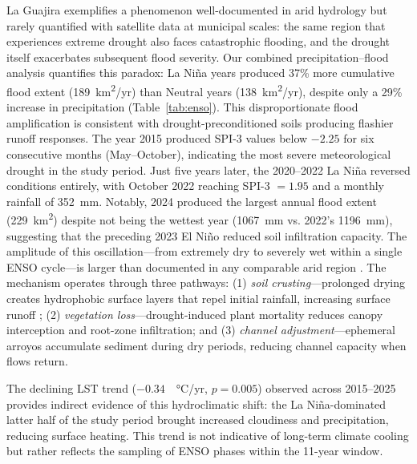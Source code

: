 \documentclass{article}
\begin{document}
La Guajira exemplifies a phenomenon well-documented in arid hydrology but rarely quantified with satellite data at municipal scales: the same region that experiences extreme drought also faces catastrophic flooding, and the drought itself exacerbates subsequent flood severity. Our combined precipitation--flood analysis quantifies this paradox: La Ni\~na years produced 37\% more cumulative flood extent (\SI{189}{\kilo\metre\squared/yr}) than Neutral years (\SI{138}{\kilo\metre\squared/yr}), despite only a 29\% increase in precipitation (Table~\ref{tab:enso}). This disproportionate flood amplification is consistent with drought-preconditioned soils producing flashier runoff responses. The year 2015 produced SPI-3 values below $-2.25$ for six consecutive months (May--October), indicating the most severe meteorological drought in the study period. Just five years later, the 2020--2022 La Ni\~na reversed conditions entirely, with October 2022 reaching SPI-3 $= 1.95$ and a monthly rainfall of \SI{352}{\milli\metre}. Notably, 2024 produced the largest annual flood extent (\SI{229}{\kilo\metre\squared}) despite not being the wettest year (\SI{1067}{mm} vs. 2022's \SI{1196}{mm}), suggesting that the preceding 2023 El Ni\~no reduced soil infiltration capacity. The amplitude of this oscillation---from extremely dry to severely wet within a single ENSO cycle---is larger than documented in any comparable arid region \citep{DroughtFloodMonitoring2024}. The mechanism operates through three pathways: (1) \textit{soil crusting}---prolonged drying creates hydrophobic surface layers that repel initial rainfall, increasing surface runoff \citep{Alabbad2023}; (2) \textit{vegetation loss}---drought-induced plant mortality reduces canopy interception and root-zone infiltration; and (3) \textit{channel adjustment}---ephemeral arroyos accumulate sediment during dry periods, reducing channel capacity when flows return.

The declining LST trend ($-0.34$~\SI{}{\celsius/yr}, $p = 0.005$) observed across 2015--2025 provides indirect evidence of this hydroclimatic shift: the La Ni\~na-dominated latter half of the study period brought increased cloudiness and precipitation, reducing surface heating. This trend is not indicative of long-term climate cooling but rather reflects the sampling of ENSO phases within the 11-year window.
\end{document}
